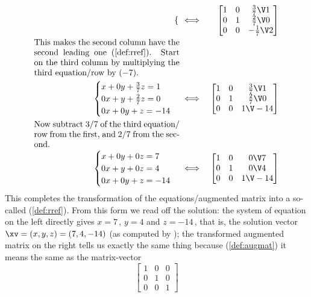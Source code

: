 \begin{example}
\begin{solution}
\begin{eqnarray*}
\begin{cases}
\end{cases}
&\iff&%
\begin{bmatrix} 1&0&\frac37\V1\\0&1&\frac27\V0\\0&0&-\frac17\V2 \end{bmatrix}
\\[0ex plus 1ex]
\parbox{0.5\linewidth}{This makes the second column have the second leading one (\autoref{def:rref}).  
Start on the third column by multiplying the third equation\slash row by~\((-7)\).}
\\[0ex plus 1ex]
\begin{cases}
x+0y+\frac37z=1\\ 0x+y+\frac27z=0\\ 0x+0y+z=-14
\end{cases}
&\iff&%
\begin{bmatrix} 1&0&\frac37\V1\\0&1&\frac27\V0\\0&0&1\V-14 \end{bmatrix}
\\[0ex plus 1ex]
\parbox{0.5\linewidth}{Now subtract \(3/7\)~of the third equation\slash row from the first, and \(2/7\) from the second.}
\\[0ex plus 1ex]
\begin{cases}
x+0y+0z=7\\ 0x+y+0z=4\\ 0x+0y+z=-14
\end{cases}
&\iff&%
\begin{bmatrix} 1&0&0\V7\\0&1&0\V4\\0&0&1\V-14 \end{bmatrix}
\end{eqnarray*}
This completes the transformation of the equations\slash augmented matrix into a so-called  (\autoref{def:rref}).
From this form we read off the solution:  the system of equation on the left directly gives \(x=7\)\,, \(y=4\) and \(z=-14\)\,, that is, the solution vector \(\xv=(x,y,z)=(7,4,-14)\) (as computed by \script);
the transformed augmented matrix on the right tells us exactly the same thing because (\autoref{def:augmat}) it means the same as the matrix-vector 
\begin{equation*}
\begin{bmatrix} 1&0&0\\0&1&0\\0&0&1 \end{bmatrix}

\end{equation*}
\end{solution}
\end{example}
